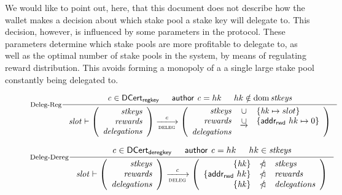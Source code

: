 We would like to point out, here, that this document does not describe
how the wallet makes a decision about which stake pool a stake key will
delegate to. This decision, however, is influenced by some parameters in the
protocol. These parameters determine which stake pools are more profitable
to delegate to, as well as the optimal number of stake pools in the system,
by means of regulating reward distribution.
This avoids forming a monopoly of a a single large stake pool constantly
being delegated to.


\begin{figure}
  \centering
  \begin{equation}\label{eq:deleg-reg}
    \inference[Deleg-Reg]
    {
      \var{c}\in\DCertRegKey & \cauthor{c} = hk & hk \notin \dom \var{stkeys}
    }
    {
      \var{slot} \vdash
      \left(
      \begin{array}{r}
        \var{stkeys} \\
        \var{rewards} \\
        \var{delegations}
      \end{array}
      \right)
      \trans{deleg}{\var{c}}
      \left(
      \begin{array}{rcl}
        \var{stkeys} & \union & \{\var{hk} \mapsto slot\}\\
        \var{rewards} & \unionoverrideRight & \{\addrRw \var{hk} \mapsto 0\}\\
        \var{delegations}
      \end{array}
      \right)
    }
  \end{equation}

  \begin{equation}\label{eq:deleg-dereg}
    \inference[Deleg-Dereg]
    {
      \var{c}\in \DCertDeRegKey  & \cauthor{c} = hk & hk \in \var{stkeys}
    }
    {
      \var{slot} \vdash
      \left(
      \begin{array}{r}
        \var{stkeys} \\
        \var{rewards} \\
        \var{delegations}
      \end{array}
      \right)
      \trans{deleg}{\var{c}}
      \left(
      \begin{array}{rcl}
        \{\var{hk}\} & \subtractdom & \var{stkeys}\\
        \{\addrRw \var{hk}\} & \subtractdom & \var{rewards} \\
        \{\var{hk}\} & \subtractdom & \var{delegations}
      \end{array}
      \right)
    }
  \end{equation}


\end{figure}
